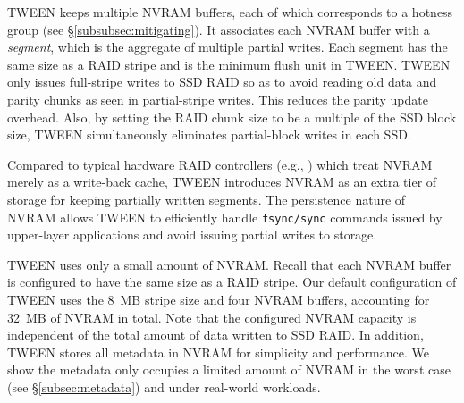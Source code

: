 
TWEEN keeps multiple NVRAM buffers, each of which corresponds to a hotness
group (see \S\ref{subsubsec:mitigating}). It associates each NVRAM buffer with
a \textit{segment}, which is the aggregate of multiple partial writes.  Each
segment has the same size as a RAID stripe and is the minimum flush unit in
TWEEN.  TWEEN only issues full-stripe writes to SSD RAID so as to avoid
reading old data and parity chunks as seen in partial-stripe writes.  This reduces the
parity update overhead.  Also, by setting the RAID chunk size to be a multiple
of the SSD block size, TWEEN simultaneously eliminates partial-block writes in
each SSD. 


Compared to typical hardware RAID controllers (e.g., \cite{dell,lsi}) which
treat NVRAM merely as a write-back cache, TWEEN introduces NVRAM as an extra
tier of storage for keeping partially written segments.  The persistence
nature of NVRAM allows TWEEN to efficiently handle \texttt{fsync/sync}
commands issued by upper-layer applications and avoid issuing partial writes
to storage. 


TWEEN uses only a small amount of NVRAM.  Recall that each NVRAM buffer is
configured to have the same size as a RAID stripe.  Our default configuration
of TWEEN uses the \SI{8}{MB} stripe size and four NVRAM buffers, accounting for
\SI{32}{MB} of NVRAM in total.  Note that the configured NVRAM capacity is
independent of the total amount of data written to SSD RAID.  In addition,
TWEEN stores all metadata in NVRAM for simplicity and performance.  We show
the metadata only occupies a limited amount of NVRAM in the worst case (see
\S\ref{subsec:metadata}) and under real-world workloads. 

